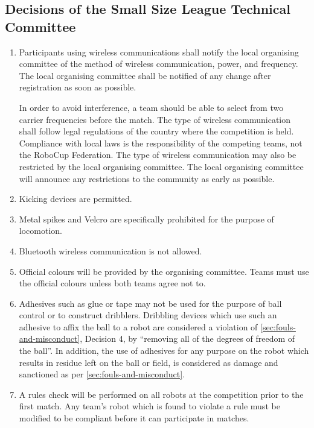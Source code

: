 \subsection*{Decisions of the Small Size League Technical Committee}
\begin{enumerate}
\item
Participants using wireless communications shall notify the local organising committee of the method of wireless communication, power, and frequency.
The local organising committee shall be notified of any change after registration as soon as possible.

In order to avoid interference, a team should be able to select from two carrier frequencies before the match.
The type of wireless communication shall follow legal regulations of the country where the competition is held.
Compliance with local laws is the responsibility of the competing teams, not the RoboCup Federation.
The type of wireless communication may also be restricted by the local organising committee.
The local organising committee will announce any restrictions to the community as early as possible.

\item
Kicking devices are permitted.

\item
Metal spikes and Velcro are specifically prohibited for the purpose of locomotion.

\item
Bluetooth wireless communication is not allowed.

\item
Official colours will be provided by the organising committee.
Teams must use the official colours unless both teams agree not to.

\item
Adhesives such as glue or tape may not be used for the purpose of ball control or to construct dribblers.
Dribbling devices which use such an adhesive to affix the ball to a robot are considered a violation of \autoref{sec:fouls-and-misconduct}, Decision 4, by ``removing all of the degrees of freedom of the ball''.
In addition, the use of adhesives for any purpose on the robot which results in residue left on the ball or field, is considered as damage and sanctioned as per \autoref{sec:fouls-and-misconduct}.

\item
A rules check will be performed on all robots at the competition prior to the first match.
Any team's robot which is found to violate a rule must be modified to be compliant before it can participate in matches.

\end{enumerate}
